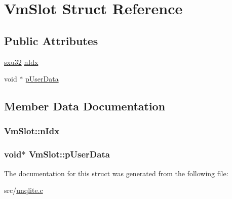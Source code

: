 \hypertarget{struct_vm_slot}{\section{Vm\-Slot Struct Reference}
\label{d1/d4e/struct_vm_slot}
}
\subsection*{Public Attributes}
\begin{DoxyCompactItemize}
\item 
\hyperlink{unqlite_8c_abc5a8a3f345c200c98c485551f49666e}{sxu32} \hyperlink{struct_vm_slot_accdada89a96a7ba3c3eac9d23180b724}{n\-Idx}
\item 
void $\ast$ \hyperlink{struct_vm_slot_abd91d7a6b1fff11d507dea19f23497fc}{p\-User\-Data}
\end{DoxyCompactItemize}


\subsection{Member Data Documentation}
\hypertarget{struct_vm_slot_accdada89a96a7ba3c3eac9d23180b724}{
\subsubsection[{n\-Idx}]{ Vm\-Slot\-::n\-Idx}}\label{d1/d4e/struct_vm_slot_accdada89a96a7ba3c3eac9d23180b724}
\hypertarget{struct_vm_slot_abd91d7a6b1fff11d507dea19f23497fc}{
\subsubsection[{p\-User\-Data}]{\setlength{\rightskip}{0pt plus 5cm}void$\ast$ Vm\-Slot\-::p\-User\-Data}}\label{d1/d4e/struct_vm_slot_abd91d7a6b1fff11d507dea19f23497fc}


The documentation for this struct was generated from the following file\-:\begin{DoxyCompactItemize}
\item 
src/\hyperlink{unqlite_8c}{unqlite.\-c}\end{DoxyCompactItemize}
